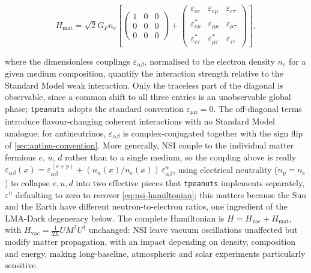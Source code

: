 \begin{equation}
  H_{\mathrm{mat}} =
  \sqrt{2}G_F n_e
  \left[
  \begin{pmatrix}
    1 & 0 & 0\\
    0 & 0 & 0\\
    0 & 0 & 0
  \end{pmatrix}
  +
  \begin{pmatrix}
    \varepsilon_{ee} & \varepsilon_{e\mu} & \varepsilon_{e\tau}\\
    \varepsilon_{e\mu}^{*} & \varepsilon_{\mu\mu} & \varepsilon_{\mu\tau}\\
    \varepsilon_{e\tau}^{*} & \varepsilon_{\mu\tau}^{*} & \varepsilon_{\tau\tau}
  \end{pmatrix}
  \right],
  \label{eq:nsi-hamiltonian}
\end{equation}

where the dimensionless couplings \(\varepsilon_{\alpha\beta}\), normalised to the electron density \(n_e\) for a given medium composition, quantify the interaction strength relative to the Standard Model weak interaction. Only the traceless part of the diagonal is observable, since a common shift to all three entries is an unobservable global phase; \texttt{tpeanuts} adopts the standard convention \(\varepsilon_{\mu\mu}=0\). The off-diagonal terms introduce flavour-changing coherent interactions with no Standard Model analogue; for antineutrinos, \(\varepsilon_{\alpha\beta}\) is complex-conjugated together with the sign flip of \cref{sec:antinu-convention}. More generally, NSI couple to the individual matter fermions \(e\), \(u\), \(d\) rather than to a single medium, so the coupling above is really \(\varepsilon_{\alpha\beta}(x)=\varepsilon_{\alpha\beta}^{(e+p)}+(n_n(x)/n_e(x))\,\varepsilon_{\alpha\beta}^{n}\), using electrical neutrality (\(n_p=n_e\)) to collapse \(e,u,d\) into two effective pieces that \texttt{tpeanuts} implements separately, \(\varepsilon^{n}\) defaulting to zero to recover \cref{eq:nsi-hamiltonian}; this matters because the Sun and the Earth have different neutron-to-electron ratios, one ingredient of the LMA-Dark degeneracy below. The complete Hamiltonian is \(H=H_{\mathrm{vac}}+H_{\mathrm{mat}}\), with \(H_{\mathrm{vac}}=\frac{1}{2E}U M^2 U^{\dagger}\) unchanged: NSI leave vacuum oscillations unaffected but modify matter propagation, with an impact depending on density, composition and energy, making long-baseline, atmospheric and solar experiments particularly sensitive.

